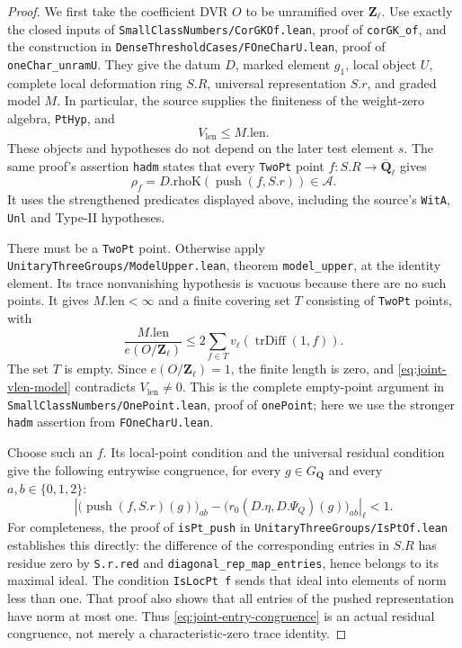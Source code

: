 \begin{proof}
We first take the coefficient DVR $O$ to be unramified over
$\mathbf Z_\ell$. Use exactly the closed inputs of
\texttt{SmallClassNumbers/CorGKOf.lean}, proof of \texttt{corGK\_of},
and the construction in
\texttt{DenseThresholdCases/FOneCharU.lean}, proof of
\texttt{oneChar\_unramU}. They give the datum $D$, marked element
$g_1$, local object $U$, complete local deformation ring $S.R$,
universal representation $S.r$, and graded model $M$. In particular,
the source supplies the finiteness of the weight-zero algebra,
\texttt{PtHyp}, and
\begin{equation}\label{eq:joint-vlen-model}
 V_{\mathrm{len}}\le M.\mathrm{len}.
\end{equation}
These objects and hypotheses do not depend on the later test element
$s$. The same proof's assertion \texttt{hadm} states that every
\texttt{TwoPt} point $f:S.R\to\overline{\mathbf Q}_\ell$ gives
\[
 \rho_f=D.\mathrm{rhoK}(\operatorname{push}(f,S.r))\in\mathcal A.
\]
It uses the strengthened predicates displayed above, including the
source's \texttt{WitA}, \texttt{Unl} and Type-II hypotheses.

There must be a \texttt{TwoPt} point. Otherwise apply
\texttt{UnitaryThreeGroups/ModelUpper.lean}, theorem
\texttt{model\_upper}, at the identity element. Its trace nonvanishing
hypothesis is vacuous because there are no such points. It gives
$M.\mathrm{len}<\infty$ and a finite covering set $T$ consisting of
\texttt{TwoPt} points, with
\[
 \frac{M.\mathrm{len}}{e(O/\mathbf Z_\ell)}
       \le 2\sum_{f\in T}v_\ell(\operatorname{trDiff}(1,f)).
\]
The set $T$ is empty. Since $e(O/\mathbf Z_\ell)=1$, the finite
length is zero, and \eqref{eq:joint-vlen-model} contradicts
$V_{\mathrm{len}}\ne0$. This is the complete empty-point argument in
\texttt{SmallClassNumbers/OnePoint.lean}, proof of \texttt{onePoint};
here we use the stronger \texttt{hadm} assertion from
\texttt{FOneCharU.lean}.

Choose such an $f$. Its local-point condition and the universal residual
condition give the following entrywise congruence, for every
$g\in G_{\mathbf Q}$ and every $a,b\in\{0,1,2\}$:
\begin{equation}\label{eq:joint-entry-congruence}
 \left|\bigl(\operatorname{push}(f,S.r)(g)\bigr)_{ab}
            -\bigl(r_0(D.\eta,D.\Psi_Q)(g)\bigr)_{ab}\right|_\ell<1.
\end{equation}
For completeness, the proof of \texttt{isPt\_push} in
\texttt{UnitaryThreeGroups/IsPtOf.lean} establishes this directly:
the difference of the corresponding entries in $S.R$ has residue zero
by \texttt{S.r.red} and \texttt{diagonal\_rep\_map\_entries}, hence
belongs to its maximal ideal. The condition \texttt{IsLocPt f} sends
that ideal into elements of norm less than one. That proof also shows
that all entries of the pushed representation have norm at most one.
Thus \eqref{eq:joint-entry-congruence} is an actual residual congruence,
not merely a characteristic-zero trace identity.


\end{proof}
